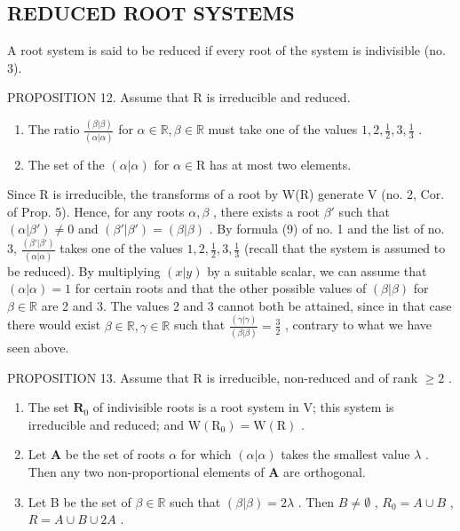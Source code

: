 \subsection{REDUCED ROOT SYSTEMS}

A root system is said to be reduced if every root of the system is indivisible (no. 3).

PROPOSITION 12. Assume that R is irreducible and reduced.

\begin{enumerate}
\def\labelenumi{(\roman{enumi})}
\item
  The ratio \(\frac{(\beta|\beta)}{(\alpha|\alpha)}\) for \(\alpha \in \mathbb{R}, \beta \in \mathbb{R}\) must take one of the values \(1, 2, \frac{1}{2}, 3, \frac{1}{3}\) .
\item
  The set of the \((\alpha |\alpha)\) for \(\alpha \in \mathrm{R}\) has at most two elements.
\end{enumerate}

Since R is irreducible, the transforms of a root by W(R) generate V (no. 2, Cor. of Prop. 5). Hence, for any roots \(\alpha, \beta\) , there exists a root \(\beta'\) such that \((\alpha|\beta') \neq 0\) and \((\beta'|\beta') = (\beta|\beta)\) . By formula (9) of no. 1 and the list of no. 3, \(\frac{(\beta'|\beta')}{(\alpha|\alpha)}\) takes one of the values \(1, 2, \frac{1}{2}, 3, \frac{1}{3}\) (recall that the system is assumed to be reduced). By multiplying \((x|y)\) by a suitable scalar, we can assume that \((\alpha|\alpha) = 1\) for certain roots and that the other possible values of \((\beta|\beta)\) for \(\beta \in \mathbb{R}\) are 2 and 3. The values 2 and 3 cannot both be attained, since in that case there would exist \(\beta \in \mathbb{R}, \gamma \in \mathbb{R}\) such that \(\frac{(\gamma|\gamma)}{(\beta|\beta)} = \frac{3}{2}\) , contrary to what we have seen above.

PROPOSITION 13. Assume that R is irreducible, non-reduced and of rank \(\geqslant 2\) .

\begin{enumerate}
\def\labelenumi{(\roman{enumi})}
\item
  The set \(\mathbf{R}_0\) of indivisible roots is a root system in V; this system is irreducible and reduced; and \(\mathrm{W}(\mathrm{R}_0) = \mathrm{W}(\mathrm{R})\) .
\item
  Let \(\mathbf{A}\) be the set of roots \(\alpha\) for which \((\alpha |\alpha)\) takes the smallest value \(\lambda\) . Then any two non-proportional elements of \(\mathbf{A}\) are orthogonal.
\item
  Let B be the set of \(\beta \in \mathbb{R}\) such that \((\beta |\beta) = 2\lambda\) . Then \(B \neq \emptyset\) , \(R_0 = A \cup B\) , \(R = A \cup B \cup 2A\) .
\end{enumerate}

